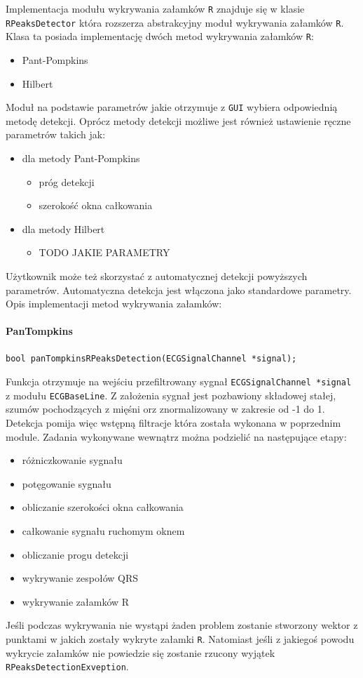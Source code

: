 \documentclass[a4paper, 11pt]{article}
\begin{document}
Implementacja modułu wykrywania załamków \verb|R| znajduje się w klasie \verb|RPeaksDetector| która rozszerza abstrakcyjny moduł wykrywania załamków \verb|R|. Klasa ta posiada implementację dwóch metod wykrywania załamków \verb|R|:
\begin{itemize}
	\item Pant-Pompkins
	\item Hilbert
\end{itemize}
Moduł na podstawie parametrów jakie otrzymuje z \verb|GUI| wybiera odpowiednią metodę detekcji. Oprócz metody detekcji możliwe jest również ustawienie ręczne parametrów takich jak:
\begin{itemize}
	\item dla metody Pant-Pompkins
	\begin{itemize}
		\item próg detekcji
		\item szerokość okna całkowania
	\end{itemize}
	\item dla metody Hilbert
	\begin{itemize}
		\item TODO JAKIE PARAMETRY
	\end{itemize}
\end{itemize}
Użytkownik może też skorzystać z automatycznej detekcji powyższych parametrów. Automatyczna detekcja jest włączona jako standardowe parametry.
Opis implementacji metod wykrywania załamków:
\paragraph{PanTompkins}
\begin{lstlisting}
bool panTompkinsRPeaksDetection(ECGSignalChannel *signal);
\end{lstlisting}
Funkcja otrzymuje na wejściu przefiltrowany sygnał \verb|ECGSignalChannel *signal| z modułu \verb|ECGBaseLine|. Z założenia sygnał jest pozbawiony składowej stałej, szumów pochodzących z mięśni orz znormalizowany w zakresie od -1 do 1. Detekcja pomija więc wstępną filtracje która została wykonana w poprzednim module. Zadania wykonywane wewnątrz można podzielić na następujące etapy:
\begin{itemize}
	\item różniczkowanie sygnału
	\item potęgowanie sygnału
	\item obliczanie szerokości okna całkowania 
	\item całkowanie sygnału ruchomym oknem
	\item obliczanie progu detekcji 
	\item wykrywanie zespołów QRS
	\item wykrywanie załamków R
\end{itemize}
Jeśli podczas wykrywania nie wystąpi żaden problem zostanie stworzony wektor z punktami w jakich zostały wykryte załamki \verb|R|. Natomiast jeśli z jakiegoś powodu wykrycie załamków nie powiedzie się zostanie rzucony wyjątek \verb|RPeaksDetectionExveption|.
\end{document}
